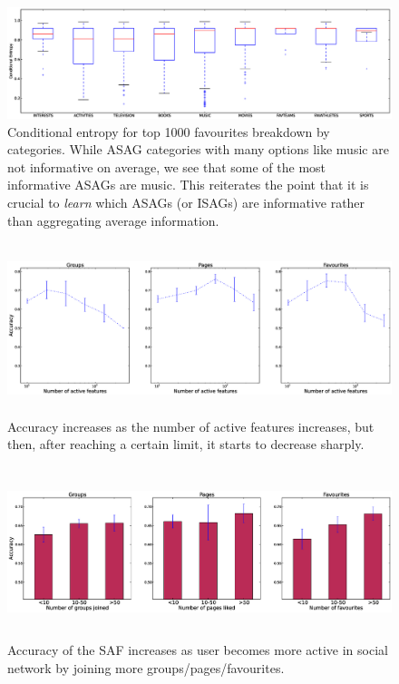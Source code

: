 \begin{figure}[tbp!]
\hspace{-12mm}\includegraphics[width=200mm]{data/plots/boxPlots/CEvsFavTypes.eps}
\vspace{-7mm}
\caption{Conditional entropy for top 1000 favourites breakdown by categories.  While ASAG categories
with many options like music are not informative on average, we see
that some of the most informative ASAGs are music.  This reiterates
the point that it is crucial to \emph{learn} which ASAGs (or ISAGs)
are informative rather than aggregating average information.}
\label{Fig5}
\end{figure}

\begin{figure}[tbh!]
\centering
\includegraphics[width=180mm, height=50mm]{data/plots/new/accuracyVsactiveFeatures.eps}
\vspace{-6mm}
\caption{Accuracy increases as the number of active features increases, but then, after reaching a certain limit, it starts to decrease sharply.
}
\label{fig:AccuracyVsactiveFeats}
\end{figure}

\begin{figure}[tbh!]
\centering
\includegraphics[width=180mm, height=50mm]{data/plots/new/accuracyVsmembership.eps}
\vspace{-6mm}
\caption{Accuracy of the SAF increases as user becomes more active in social network by joining more groups/pages/favourites.}
\label{AccuracyVsmembership}
\end{figure}


